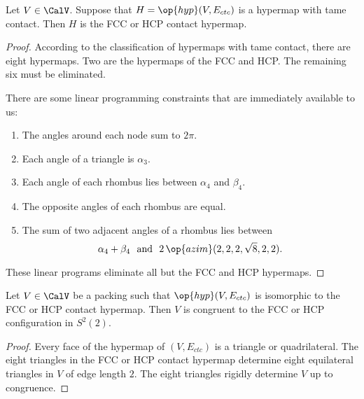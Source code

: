 \begin{lemma}[]\label{lemma:fcc-ft} Let $V\in \CalV$.
  Suppose that $H=\op{hyp}(V,E_{ctc})$ is a hypermap with tame
  contact.  Then $H$ is the FCC or HCP contact hypermap.
\end{lemma}

\begin{proof} According to the classification of hypermaps with tame
  contact, there are eight hypermaps.  Two are the hypermaps of the
  FCC and HCP.  The remaining six must be eliminated.

There are some linear
  programming constraints that are immediately available to us:
\begin{enumerate}\wasitemize 
\item The angles around each node sum to $2\pi$.
\item Each angle of a triangle is $\alpha_3$.
\item Each angle of each rhombus lies between $\alpha_4$ and $\beta_4$.
\item The opposite angles of each rhombus are equal.
\item The sum of two adjacent angles of a rhombus lies between
\[
  \alpha_4 + \beta_4 \text{~~and~~} 2\,\op{azim}(2,2,2,\sqrt8,2,2).
\]
\end{enumerate}\wasitemize 
These linear programs eliminate all but the FCC and HCP hypermaps.
\end{proof}


\begin{lemma}[]\label{lemma:kiss-fcc}
  Let $V\in \CalV$ be a packing such that $\op{hyp}(V,E_{ctc})$ is
  isomorphic to the FCC or HCP contact hypermap.  Then $V$ is
  congruent to the FCC or HCP configuration in $S^2(2)$.
\end{lemma}
%
%
%
%
%

\begin{proof} Every face of the hypermap of $(V,E_{ctc})$ is a
  triangle or quadrilateral.  The eight triangles in the FCC or HCP
  contact hypermap determine eight equilateral triangles in $V$ of
  edge length $2$.  The eight triangles rigidly determine $V$ up to
  congruence.
\end{proof}


